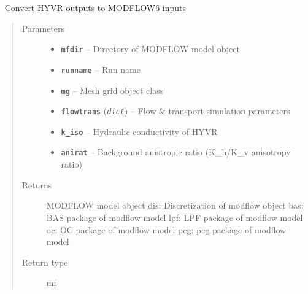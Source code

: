 \documentclass[letterpaper,10pt,english]{sphinxmanual}
\begin{document}
\begin{fulllineitems}
\label{hyvr:hyvr.hyvr.utils.to_mf6}~
Convert HYVR outputs to MODFLOW6 inputs
\begin{quote}\begin{description}
\item[{Parameters}] \leavevmode\begin{itemize}
\item {} 
\textbf{\texttt{mfdir}} -- Directory of MODFLOW model object

\item {} 
\textbf{\texttt{runname}} -- Run name

\item {} 
\textbf{\texttt{mg}} -- Mesh grid object class

\item {} 
\textbf{\texttt{flowtrans}} (\emph{\texttt{dict}}) -- Flow \& transport simulation parameters

\item {} 
\textbf{\texttt{k\_iso}} -- Hydraulic conductivity of HYVR

\item {} 
\textbf{\texttt{anirat}} -- Background anistropic ratio (K\_h/K\_v anisotropy ratio)

\end{itemize}

\item[{Returns}] \leavevmode
MODFLOW model object
dis:                            Discretization of modflow object
bas:                            BAS package of modflow model
lpf:                            LPF package of modflow model
oc:                                     OC package of modflow model
pcg:                            pcg package of modflow model

\item[{Return type}] \leavevmode
mf

\end{description}\end{quote}

\end{fulllineitems}

\end{document}
